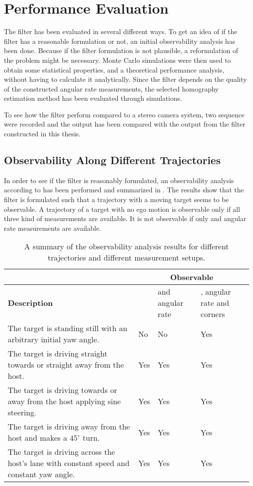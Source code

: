\chapter{Performance Evaluation}
\label{cha:result}
The filter has been evaluated in several different ways.
To get an idea of if the filter has a reasonable formulation or not, an initial observability analysis has been done.
Because if the filter formulation is not plausible, a reformulation of the problem might be necessary.
Monte Carlo simulations were then used to obtain some statistical properties, and a theoretical performance analysis, without having to calculate it analytically.
Since the filter depends on the quality of the constructed angular rate measurements, the selected homography estimation method has been evaluated through simulations.

To see how the filter perform compared to a stereo camera system, two sequence were recorded and the output has been compared with the output from the filter constructed in this thesis.

\section{Observability Along Different Trajectories}
\label{sec:observabilityresult}
In order to see if the filter is reasonably formulated, an observability analysis according to  has been performed and summarized in .
The results show that the filter is formulated such that a trajectory with a moving target seems to be observable.
A trajectory of a target with no ego motion is observable only if all three kind of measurements are available.
It is not observable if only \abbrROI and angular rate measurements are available.

\begin{table}[!ht]
	\centering
	\caption{\label{tab:observabilityresult} A summary of the observability analysis results for different trajectories and different measurement setups.}
	\begin{tabular}{|p{5cm}|p{1cm}|p{2cm}|p{2.5cm}|}
		\cline{2-4}
		\multicolumn{1}{c|}{} & \multicolumn{3}{c|}{\textbf{Observable}} \\
		\hline
		\textbf{Description} & \abbrROI & \abbrROI and angular rate & \abbrROI, angular rate and corners \\
		\hline
		The target is standing still with an arbitrary initial yaw angle. & No & No & Yes \\
		\hline
		The target is driving straight towards or straight away from the host. & Yes & Yes & Yes \\
		\hline
		The target is driving towards or away from the host applying sine steering. & Yes & Yes & Yes \\
		\hline
		The target is driving away from the host and makes a $45^\circ$ turn. & Yes & Yes & Yes \\
		\hline
		The target is driving across the host's lane with constant speed and constant yaw angle. & Yes & Yes & Yes \\
		\hline
	\end{tabular}
\end{table}


